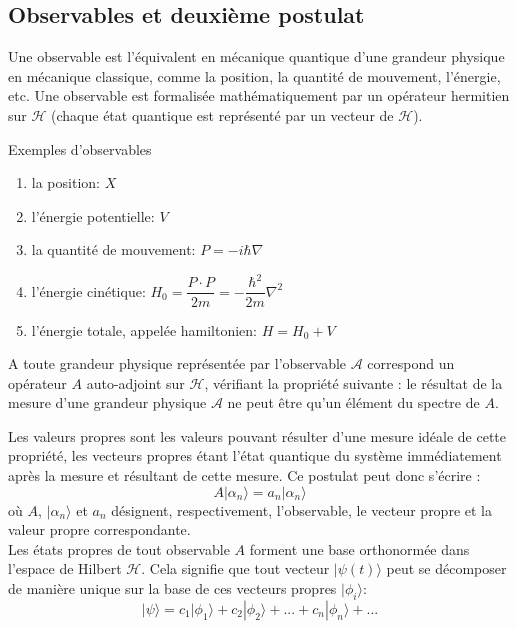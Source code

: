 \subsection{Observables et deuxième postulat}
Une observable est l'équivalent en mécanique quantique d'une grandeur physique en mécanique classique, comme la position, la quantité de mouvement, l'énergie, etc. Une observable est formalisée mathématiquement par un opérateur hermitien sur $\mathcal{H}$ (chaque état quantique est représenté par un vecteur de $\mathcal{H}$). 
\begin{ex}
	Exemples d'observables
	\begin{enumerate}
		\item la position: $X$
		\item l'énergie potentielle: $V$
		\item la quantité de mouvement: $P=-i\hbar \nabla$
		\item l'énergie cinétique:
		$H_0=\dfrac{P \cdot P}{2m}=-\dfrac{\hbar ^{2}}{2m}\nabla^{2}$
		\item l'énergie totale, appelée hamiltonien:
		$H=H_0+V$
	\end{enumerate}
\end{ex}
\begin{Post}
	A toute grandeur physique représentée par l'observable $\mathcal{A}$ correspond un opérateur $A$ auto-adjoint sur $\mathcal{H}$, vérifiant la propriété suivante : le résultat de la mesure d’une grandeur physique $\mathcal{A}$ ne peut être qu’un élément du spectre de $A$.
\end{Post}
Les valeurs propres sont les valeurs pouvant résulter d'une mesure idéale de cette propriété, les vecteurs propres étant l'état quantique du système immédiatement après la mesure et résultant de cette mesure. Ce postulat peut donc s'écrire :
$$
A|\alpha _{n}\rangle =a_{n}|\alpha _{n}\rangle 
$$
où $A$, $|\alpha_{n}\rangle$ et $a_n$ désignent, respectivement, l'observable, le vecteur propre et la valeur propre correspondante.\\
Les états propres de tout observable $A$ forment une base orthonormée dans l'espace de Hilbert $\mathcal{H}$.
Cela signifie que tout vecteur $|\psi (t)\rangle$ peut se décomposer de manière unique sur la base de ces vecteurs propres $|\phi_{i}\rangle$:
$$
|\psi \rangle =c_{1}|\phi _{1}\rangle +c_{2}|\phi _{2}\rangle +...+c_{n}|\phi _{n}\rangle +...
$$
